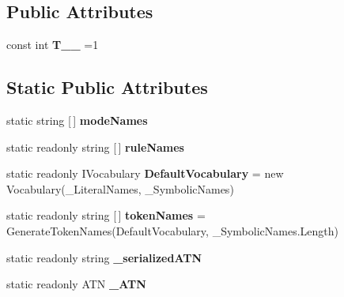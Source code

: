 \subsection*{Public Attributes}
\begin{DoxyCompactItemize}
\item 
\mbox{\label{classzlua_1_1_lua_lexer_af51167a383947dc3a4406fe7a0f9fd83}} 
const int {\bfseries T\+\_\+\+\_} =1
\end{DoxyCompactItemize}
\subsection*{Static Public Attributes}
\begin{DoxyCompactItemize}
\item 
static string \mbox{[}$\,$\mbox{]} {\bfseries mode\+Names}
\item 
static readonly string \mbox{[}$\,$\mbox{]} {\bfseries rule\+Names}
\item 
\mbox{\label{classzlua_1_1_lua_lexer_a2bc32a4a7ed09277856b690ac22a2003}} 
static readonly I\+Vocabulary {\bfseries Default\+Vocabulary} = new Vocabulary(\+\_\+\+Literal\+Names, \+\_\+\+Symbolic\+Names)
\item 
\mbox{\label{classzlua_1_1_lua_lexer_aad4914b36b185d4edbd3dab1f1b7a987}} 
static readonly string \mbox{[}$\,$\mbox{]} {\bfseries token\+Names} = Generate\+Token\+Names(Default\+Vocabulary, \+\_\+\+Symbolic\+Names.\+Length)
\item 
\mbox{\label{classzlua_1_1_lua_lexer_ad44eb255ff75fd867a76cd5fab32f7da}} 
static readonly string {\bfseries \+\_\+serialized\+A\+TN}
\item 
static readonly A\+TN {\bfseries \+\_\+\+A\+TN}
\end{DoxyCompactItemize}
